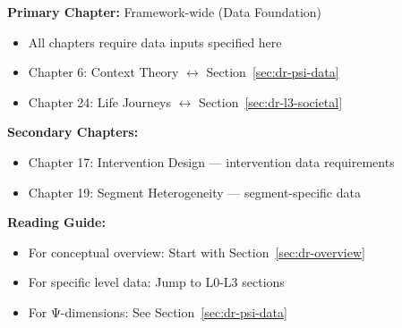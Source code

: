 %
%

%
%
%
%

\begin{tcolorbox}[colback=purple!5!white, colframe=purple!75!black,
    title=Chapter Linkage]

\textbf{Primary Chapter:} Framework-wide (Data Foundation)
\begin{itemize}[nosep]
\item All chapters require data inputs specified here
\item Chapter 6: Context Theory $\leftrightarrow$ Section~\ref{sec:dr-psi-data}
\item Chapter 24: Life Journeys $\leftrightarrow$ Section~\ref{sec:dr-l3-societal}
\end{itemize}

\textbf{Secondary Chapters:}
\begin{itemize}[nosep]
\item Chapter 17: Intervention Design --- intervention data requirements
\item Chapter 19: Segment Heterogeneity --- segment-specific data
\end{itemize}

\textbf{Reading Guide:}
\begin{itemize}[nosep]
\item For conceptual overview: Start with Section~\ref{sec:dr-overview}
\item For specific level data: Jump to L0-L3 sections
\item For Ψ-dimensions: See Section~\ref{sec:dr-psi-data}
\end{itemize}

\end{tcolorbox}


